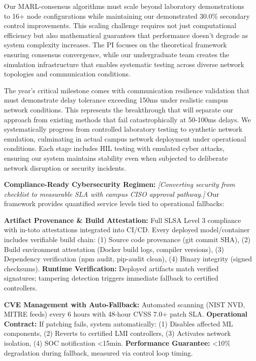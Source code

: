 \documentclass[12pt]{article}
\begin{document}
Our MARL-consensus algorithms must scale beyond laboratory demonstrations to 16+ node configurations while maintaining our demonstrated 30.0\% secondary control improvements. This scaling challenge requires not just computational efficiency but also mathematical guarantees that performance doesn't degrade as system complexity increases. The PI focuses on the theoretical framework ensuring consensus convergence, while our undergraduate team creates the simulation infrastructure that enables systematic testing across diverse network topologies and communication conditions.

The year's critical milestone comes with communication resilience validation that must demonstrate delay tolerance exceeding 150ms under realistic campus network conditions. This represents the breakthrough that will separate our approach from existing methods that fail catastrophically at 50-100ms delays. We systematically progress from controlled laboratory testing to synthetic network emulation, culminating in actual campus network deployment under operational conditions. Each stage includes HIL testing with emulated cyber attacks, ensuring our system maintains stability even when subjected to deliberate network disruption or security incidents.

\textbf{Compliance-Ready Cybersecurity Regimen:} \textit{[Converting security from checklist to measurable SLA with campus CISO approval pathway.]} Our framework provides quantified service levels tied to operational fallbacks:

\textbf{Artifact Provenance \& Build Attestation:} Full SLSA Level 3 compliance with in-toto attestations integrated into CI/CD. Every deployed model/container includes verifiable build chain: (1) Source code provenance (git commit SHA), (2) Build environment attestation (Docker build logs, compiler versions), (3) Dependency verification (npm audit, pip-audit clean), (4) Binary integrity (signed checksums). \textbf{Runtime Verification:} Deployed artifacts match verified signatures; tampering detection triggers immediate fallback to certified controllers.

\textbf{CVE Management with Auto-Fallback:} Automated scanning (NIST NVD, MITRE feeds) every 6 hours with 48-hour CVSS 7.0+ patch SLA. \textbf{Operational Contract:} If patching fails, system automatically: (1) Disables affected ML components, (2) Reverts to certified LMI controllers, (3) Activates network isolation, (4) SOC notification <15min. \textbf{Performance Guarantee:} <10\% degradation during fallback, measured via control loop timing.
\end{document}
